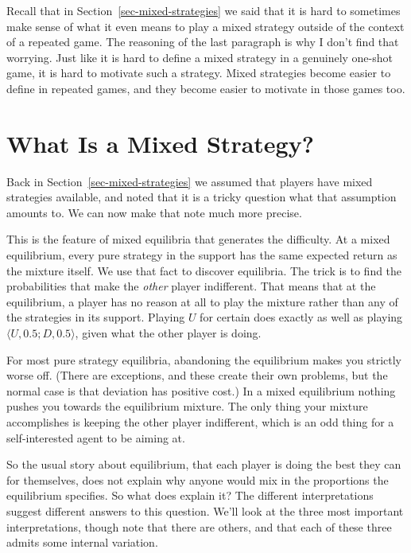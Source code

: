 \documentclass[
  11pt,
  letterpaper,
]{scrbook}
\begin{document}
Recall that in Section~\ref{sec-mixed-strategies} we said that it is
hard to sometimes make sense of what it even means to play a mixed
strategy outside of the context of a repeated game. The reasoning of the
last paragraph is why I don't find that worrying. Just like it is hard
to define a mixed strategy in a genuinely one-shot game, it is hard to
motivate such a strategy. Mixed strategies become easier to define in
repeated games, and they become easier to motivate in those games too.

\section{What Is a Mixed Strategy?}\label{sec-what-is-a-mixed-strategy}

Back in Section~\ref{sec-mixed-strategies} we assumed that players have
mixed strategies available, and noted that it is a tricky question what
that assumption amounts to. We can now make that note much more precise.

This is the feature of mixed equilibria that generates the difficulty.
At a mixed equilibrium, every pure strategy in the support has the same
expected return as the mixture itself. We use that fact to discover
equilibria. The trick is to find the probabilities that make the
\emph{other} player indifferent. That means that at the equilibrium, a
player has no reason at all to play the mixture rather than any of the
strategies in its support. Playing \(U\) for certain does exactly as
well as playing \(\langle U, 0.5; D, 0.5 \rangle\), given what the other
player is doing.

For most pure strategy equilibria, abandoning the equilibrium makes you
strictly worse off. (There are exceptions, and these create their own
problems, but the normal case is that deviation has positive cost.) In a
mixed equilibrium nothing pushes you towards the equilibrium mixture.
The only thing your mixture accomplishes is keeping the other player
indifferent, which is an odd thing for a self-interested agent to be
aiming at.

So the usual story about equilibrium, that each player is doing the best
they can for themselves, does not explain why anyone would mix in the
proportions the equilibrium specifies. So what does explain it? The
different interpretations suggest different answers to this question.
We'll look at the three most important interpretations, though note that
there are others, and that each of these three admits some internal
variation.
\end{document}
